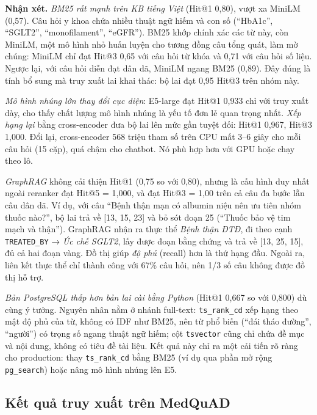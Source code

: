 \textbf{Nhận xét.} \emph{BM25 rất mạnh trên KB tiếng Việt} (Hit@1 0,80), vượt xa MiniLM (0,57). Câu hỏi y khoa chứa nhiều thuật ngữ hiếm và con số (``HbA1c'', ``SGLT2'', ``monofilament'', ``eGFR''). BM25 khớp chính xác các từ này, còn MiniLM, một mô hình nhỏ huấn luyện cho tương đồng câu tổng quát, làm mờ chúng: MiniLM chỉ đạt Hit@3 0,65 với câu hỏi từ khóa và 0,71 với câu hỏi số liệu. Ngược lại, với câu hỏi diễn đạt dân dã, MiniLM ngang BM25 (0,89). Đây đúng là tính bổ sung mà truy xuất lai khai thác: bộ lai đạt 0,95 Hit@3 trên nhóm này.

\emph{Mô hình nhúng lớn thay đổi cục diện}: E5-large đạt Hit@1 0,933 chỉ với truy xuất dày, cho thấy chất lượng mô hình nhúng là yếu tố đơn lẻ quan trọng nhất. \emph{Xếp hạng lại} bằng cross-encoder đưa bộ lai lên mức gần tuyệt đối: Hit@1 0,967, Hit@3 1,000. Đổi lại, cross-encoder 568 triệu tham số trên CPU mất 3–6 giây cho mỗi câu hỏi (15 cặp), quá chậm cho chatbot. Nó phù hợp hơn với GPU hoặc chạy theo lô.

\emph{GraphRAG} không cải thiện Hit@1 (0,75 so với 0,80), nhưng là cấu hình duy nhất ngoài reranker đạt Hit@5 = 1,000, và đạt Hit@3 = 1,00 trên cả câu đa bước lẫn câu dân dã. Ví dụ, với câu ``Bệnh thận mạn có albumin niệu nên ưu tiên nhóm thuốc nào?'', bộ lai trả về [13, 15, 23] và bỏ sót đoạn 25 (``Thuốc bảo vệ tim mạch và thận''). GraphRAG nhận ra thực thể \emph{Bệnh thận ĐTĐ}, đi theo cạnh \texttt{TREATED\_BY} → \emph{Ức chế SGLT2}, lấy được đoạn bằng chứng và trả về [13, 25, 15], đủ cả hai đoạn vàng. Đồ thị giúp \emph{độ phủ} (recall) hơn là thứ hạng đầu. Ngoài ra, liên kết thực thể chỉ thành công với 67\% câu hỏi, nên 1/3 số câu không được đồ thị hỗ trợ.

\emph{Bản PostgreSQL thấp hơn bản lai cài bằng Python} (Hit@1 0,667 so với 0,800) dù cùng ý tưởng. Nguyên nhân nằm ở nhánh full-text: \texttt{ts\_rank\_cd} xếp hạng theo mật độ phủ của từ, không có IDF như BM25, nên từ phổ biến (``đái tháo đường'', ``người'') có trọng số ngang thuật ngữ hiếm; cột \texttt{tsvector} cũng chỉ chứa đề mục và nội dung, không có tiêu đề tài liệu. Kết quả này chỉ ra một cải tiến rõ ràng cho production: thay \texttt{ts\_rank\_cd} bằng BM25 (ví dụ qua phần mở rộng \texttt{pg\_search}) hoặc nâng mô hình nhúng lên E5.


\subsection{Kết quả truy xuất trên MedQuAD}

